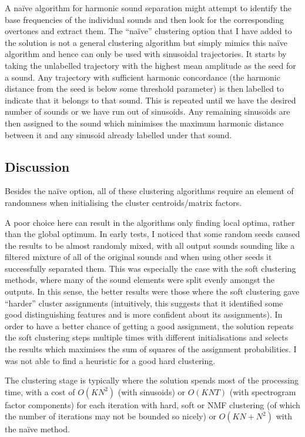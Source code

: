 \documentclass[12pt,a4paper,twoside,openright]{report}
\begin{document}
A na\"{i}ve algorithm for harmonic sound separation might attempt to identify the base frequencies of the individual sounds and then look for the corresponding overtones and extract them. The ``na\"{i}ve'' clustering option that I have added to the solution is not a general clustering algorithm but simply mimics this na\"{i}ve algorithm and hence can only be used with sinusoidal trajectories. It starts by taking the unlabelled trajectory with the highest mean amplitude as the seed for a sound. Any trajectory with sufficient harmonic concordance (the harmonic distance from the seed is below some threshold parameter) is then labelled to indicate that it belongs to that sound. This is repeated until we have the desired number of sounds or we have run out of sinusoids. Any remaining sinusoids are then assigned to the sound which minimises the maximum harmonic distance between it and any sinusoid already labelled under that sound.

{\color{red}\subsection{Discussion}

Besides the na\"{i}ve option, all of these clustering algorithms require an element of randomness when initialising the cluster centroids/matrix factors.} A poor choice here can result in the algorithms only finding local optima, rather than the global optimum. In early tests, I noticed that some random seeds caused the results to be almost randomly mixed, with all output sounds sounding like a filtered mixture of all of the original sounds and when using other seeds it successfully separated them. This was especially the case with the soft clustering methods, where many of the sound elements were split evenly amongst the outputs. In this sense, the better results were those where the soft clustering gave ``harder'' cluster assignments (intuitively, this suggests that it identified some good distinguishing features and is more confident about its assignments). In order to have a better chance of getting a good assignment, the solution repeats the soft clustering steps multiple times with different initialisations and selects the results which maximises the sum of squares of the assignment probabilities. I was not able to find a heuristic for a good hard clustering.

{\color{red}The clustering stage is typically where the solution spends most of the processing time, with a cost of $ O(KN^2) $ (with sinusoids) or $ O(KNT) $ (with spectrogram factor components) for each iteration with hard, soft or NMF clustering (of which the number of iterations may not be bounded so nicely) or $ O(KN + N^2) $ with the na\"{i}ve method.}
\end{document}
